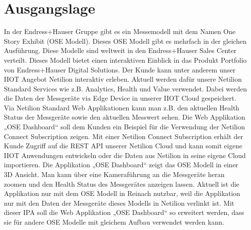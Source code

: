 \section{Ausgangslage}

In der Endress+Hauser Gruppe gibt es ein Messemodell mit dem Namen One Story Exhibit (OSE Modell). Dieses OSE Modell gibt es mehrfach in der gleichen Ausführung. Diese Modelle sind weltweit in den Endress+Hauser Sales Center verteilt. Dieses Modell bietet einen interaktiven Einblick in das Produkt Portfolio von Endress+Hauser Digital Solutions. Der Kunde kann unter anderem unser IIOT Angebot Netilion interaktiv erleben. Aktuell werden dafür unsere Netilion Standard Services wie z.B. Analytics, Health und Value verwendet. Dabei werden die Daten der Messgeräte via Edge Device in unserer IIOT Cloud gespeichert. Via Netilion Standard Web Applikationen kann man z.B. den aktuellen Health Status der Messgeräte sowie den aktuellen Messwert sehen.
\newline
\newline
Die Web Applikation „OSE Dashboard“ soll dem Kunden ein Beispiel für die Verwendung der Netilion Connect Subscription zeigen. Mit einer Netilion Connect Subscription erhält der Kunde Zugriff auf die REST API unserer Netilion Cloud und kann somit eigene IIOT Anwendungen entwickeln oder die Daten aus Netilion in seine eigene Cloud importieren. Die Applikation „OSE Dashboard“ zeigt das OSE Modell in einer 3D Ansicht. Man kann über eine Kameraführung an die Messgeräte heran zoomen und den Health Status des Messgerätes anzeigen lassen. Aktuell ist die Applikation nur mit dem OSE Modell in Reinach nutzbar, weil die Applikation nur mit den Daten der Messgeräte dieses Modells in Netilion verlinkt ist.
\newline
Mit dieser IPA soll die Web Applikation „OSE Dashboard“ so erweitert werden, dass sie für andere OSE Modelle mit gleichem Aufbau verwendet werden kann.